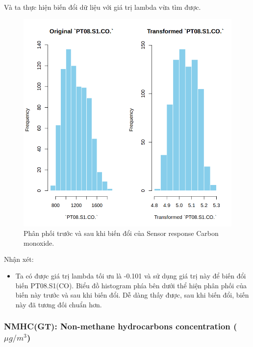 Và ta thực hiện biến đổi dữ liệu với giá trị lambda vừa tìm được.
\begin{figure}[H]
    \centering
    \includegraphics[width=0.75\columnwidth]{air_figures/PT08.S1(CO)_transformed_distribution.png}
    \caption{Phân phối trước và sau khi biến đổi của Sensor response Carbon monoxide.}
    \label{fig:srco_transformed_distribution}
\end{figure}
Nhận xét:
\begin{itemize}
    \item Ta có được giá trị lambda tối ưu là -0.101 và sử dụng giá trị này để biến đổi biến PT08.S1(CO). Biểu đồ histogram phía bên dưới thể hiện phân phối của biến này trước và sau khi biến đổi. Dễ dàng thấy được, sau khi biến đổi, biến này đã tương đối chuẩn hơn.
\end{itemize}

\subsubsection{NMHC(GT): Non-methane hydrocarbons concentration ($\mu g/ m^3$)}

